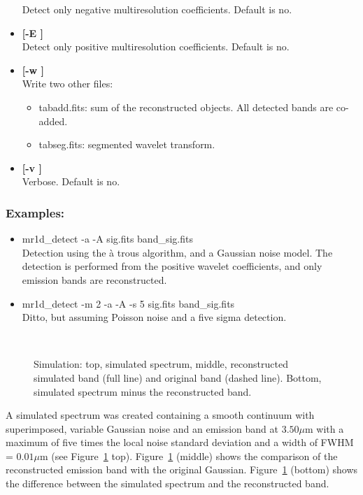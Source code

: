 \begin{itemize}
Detect only negative multiresolution coefficients. Default is no. 
\item {\bf [-E ]} \\
Detect only positive multiresolution coefficients. Default is no. 
\item {\bf [-w ]} \\
Write two other files: 
\begin{itemize}
\item tabadd.fits: sum of the reconstructed objects. All detected bands are co-added. 
\item tabseg.fits: segmented wavelet transform.
\end{itemize}
\item {\bf [-v ]} \\
Verbose. Default is no.
\end{itemize}

\subsubsection*{Examples:}
\begin{itemize}
\item mr1d\_detect -a -A sig.fits band\_sig.fits \\
Detection using the \`a trous algorithm, and a Gaussian noise model.
The detection is performed from the positive wavelet coefficients, and
only emission bands are reconstructed.
\item mr1d\_detect -m 2 -a -A -s 5 sig.fits band\_sig.fits   \\
Ditto, but assuming Poisson noise and a five sigma detection.
\end{itemize}

\begin{figure}[htb] 
\centerline{
\vbox{
\hbox{
}
\hbox{
}
}}
\caption{Simulation: top, simulated spectrum, 
middle, reconstructed simulated band (full line) and original band (dashed line). Bottom,
simulated spectrum minus the reconstructed band.}
\label{fig_detect_spect}
\end{figure}

A simulated spectrum was created containing a smooth continuum  
with superimposed, variable Gaussian noise and an emission band at $3.50\mu$m 
with a maximum of five times the local noise standard 
deviation and a width of 
FWHM = $0.01 \mu$m (see Figure~\ref{fig_detect_spect} top). 
Figure~\ref{fig_detect_spect}
(middle) shows the comparison of the 
reconstructed emission band with the original Gaussian.
Figure~\ref{fig_detect_spect} (bottom) shows the  difference between 
the simulated spectrum and the reconstructed band.


